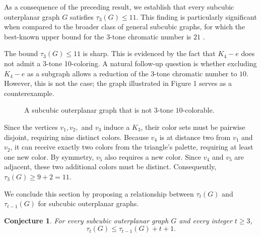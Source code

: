\documentclass[12pt]{article}
\numberwithin{theorem}{section}
\newtheorem{conjecture}{Conjecture}
\numberwithin{conjecture}{section}
\numberwithin{corollary}{section}
\numberwithin{example}{section}
\numberwithin{lemma}{section}
\numberwithin{proposition}{section}
\numberwithin{problem}{section}
\numberwithin{remark}{section}
\numberwithin{claim}{theorem}
\numberwithin{definition}{section}
\begin{document}
\noindent As a consequence of the preceding result, we establish that every subcubic outerplanar graph $G$ satisfies $\tau_3(G) \le 11$. This finding is particularly significant when compared to the broader class of general subcubic graphs, for which the best-known upper bound for the $3$-tone chromatic number is $21$ \cite{Dong2}.

\noindent The bound $\tau_3(G) \le 11$ is sharp. This is evidenced by the fact that $K_4-e$ does not admit a 3-tone 10-coloring. A natural follow-up question is whether excluding $K_4-e$ as a subgraph allows a reduction of the 3-tone chromatic number to $10$. However, this is not the case; the graph illustrated in Figure 1 serves as a counterexample.

\begin{figure}[h]
\centering
{}
\caption{A subcubic outerplanar graph that is not $3$-tone $10$-colorable.}
\label{f1}
\end{figure}
\noindent Since the vertices $v_1, v_2,$ and $v_3$ induce a $K_3$, their color sets must be pairwise disjoint, requiring nine distinct colors. Because $v_4$ is at distance two from $v_1$ and $v_2$, it can receive exactly two colors from the triangle's palette, requiring at least one new color. By symmetry, $v_5$ also requires a new color. Since $v_4$ and $v_5$ are adjacent, these two additional colors must be distinct. Consequently, $\tau_3(G) \ge 9 + 2 = 11$.  

\noindent We conclude this section by proposing a relationship between $\tau_t(G)$ and $\tau_{t-1}(G)$ for subcubic outerplanar graphs.

\begin{conjecture}
For every subcubic outerplanar graph $G$ and every integer $t\ge 3$, \[\tau_t(G)\le \tau_{t-1}(G)+t+1.\]
\end{conjecture}
\end{document}
